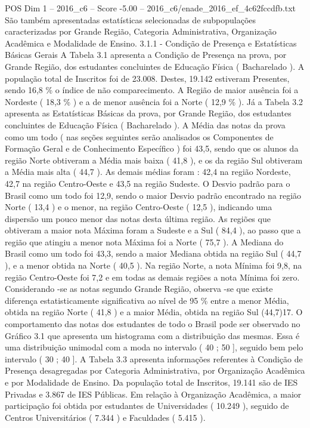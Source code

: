 \begin{textsample}{POS Dim 1 – 2016\_c6 – Score -5.00 – 2016\_c6/enade\_2016\_ef\_4c62fccdfb.txt}
São também apresentadas estatísticas selecionadas de subpopulações caracterizadas por Grande Região, Categoria Administrativa, Organização Acadêmica e Modalidade de Ensino. 3.1.1 - Condição de Presença e Estatísticas Básicas Gerais A Tabela 3.1 apresenta a Condição de Presença na prova, por Grande Região, dos estudantes concluintes de Educação Física ( Bacharelado ).
A população total de Inscritos foi de 23.008.
Destes, 19.142 estiveram Presentes, sendo 16,8 \% o índice de não comparecimento.
A Região de maior ausência foi a Nordeste ( 18,3 \% ) e a de menor ausência foi a Norte ( 12,9 \% ).
Já a Tabela 3.2 apresenta as Estatísticas Básicas da prova, por Grande Região, dos estudantes concluintes de Educação Física ( Bacharelado ).
A Média das notas da prova como um todo ( nas seções seguintes serão analisados os Componentes de Formação Geral e de Conhecimento Específico ) foi 43,5, sendo que os alunos da região Norte obtiveram a Média mais baixa ( 41,8 ), e os da região Sul obtiveram a Média mais alta ( 44,7 ).
As demais médias foram : 42,4 na região Nordeste, 42,7 na região Centro-Oeste e 43,5 na região Sudeste.
O Desvio padrão para o Brasil como um todo foi 12,9, sendo o maior Desvio padrão encontrado na região Norte ( 13,4 ) e o menor, na região Centro-Oeste ( 12,5 ), indicando uma dispersão um pouco menor das notas desta última região.
As regiões que obtiveram a maior nota Máxima foram a Sudeste e a Sul ( 84,4 ), ao passo que a região que atingiu a menor nota Máxima foi a Norte ( 75,7 ).
A Mediana do Brasil como um todo foi 43,3, sendo a maior Mediana obtida na região Sul ( 44,7 ), e a menor obtida na Norte ( 40,5 ).
Na região Norte, a nota Mínima foi 9,8, na região Centro-Oeste foi 7,2 e em todas as demais regiões a nota Mínima foi zero.
Considerando -se as notas segundo Grande Região, observa -se que existe diferença estatisticamente significativa ao nível de 95 \% entre a menor Média, obtida na região Norte ( 41,8 ) e a maior Média, obtida na região Sul (44,7)17.
O comportamento das notas dos estudantes de todo o Brasil pode ser observado no Gráfico 3.1 que apresenta um histograma com a distribuição das mesmas.
Essa é uma distribuição unimodal com a moda no intervalo ( 40 ; 50 ], seguido bem pelo intervalo ( 30 ; 40 ].
A Tabela 3.3 apresenta informações referentes à Condição de Presença desagregadas por Categoria Administrativa, por Organização Acadêmica e por Modalidade de Ensino.
Da população total de Inscritos, 19.141 são de IES Privadas e 3.867 de IES Públicas.
Em relação à Organização Acadêmica, a maior participação foi obtida por estudantes de Universidades ( 10.249 ), seguido de Centros Universitários ( 7.344 ) e Faculdades ( 5.415 ).

\end{textsample}
